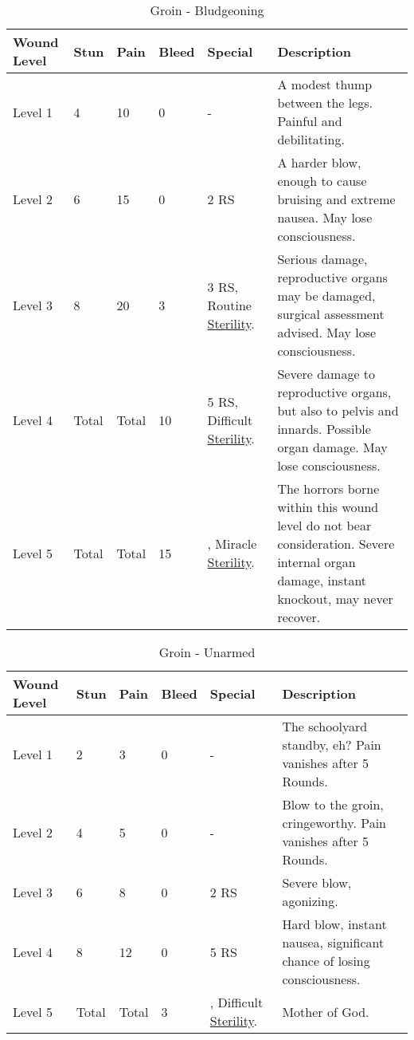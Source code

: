\documentclass[oneside,11pt,english]{book}
\begin{document}
\begin{table}[hb] %
	\caption{Groin - Bludgeoning}
	\label{wound:Groin - Bludgeoning}
	\begin{tabu} to 
Wound Level &Stun &Pain &Bleed &Special &Description\\\toprule
Level 1& 4& 10& 0& - &A modest thump between the legs. Painful and debilitating.\\
Level 2& 6& 15& 0&  2 RS &A harder blow, enough to cause bruising and extreme nausea. May lose consciousness.\\
Level 3& 8& 20& 3
	& 3 RS, \newline
		Routine~ \hyperref[bane:Barren/Sterility]{Sterility}.
	&Serious damage, reproductive organs may be damaged, surgical assessment advised. May lose consciousness.\\
Level 4& Total& Total& 10 
	& 5 RS, \newline
		Difficult~ \hyperref[bane:Barren/Sterility]{Sterility}.
	&Severe damage to reproductive organs, but also to pelvis and innards. Possible organ damage. May lose consciousness.\\
Level 5& Total& Total& 15
	&, \newline
		Miracle~ \hyperref[bane:Barren/Sterility]{Sterility}.
	&The horrors borne within this wound level do not bear consideration. Severe internal organ damage, instant knockout, may never recover.\\
	\end{tabu}
\end{table}

\begin{table}[!hb] %
	\caption{Groin - Unarmed}
	\label{wound:Groin - Unarmed}
	\begin{tabu} to 
Wound Level &Stun &Pain &Bleed &Special &Description\\\toprule
Level 1& 2& 3& 0& - &The schoolyard standby, eh? Pain vanishes after 5 Rounds.\\
Level 2& 4& 5& 0& - &Blow to the groin, cringeworthy. Pain vanishes after 5 Rounds.\\
Level 3& 6& 8& 0&  2 RS &Severe blow, agonizing.\\
Level 4& 8& 12& 0&  5 RS &Hard blow, instant nausea, significant chance of losing consciousness.\\
Level 5& Total& Total& 3 
	&, \newline
		Difficult~ \hyperref[bane:Barren/Sterility]{Sterility}.
	&Mother of God.\\
	\end{tabu}
\end{table}
	\clearpage
\end{document}
